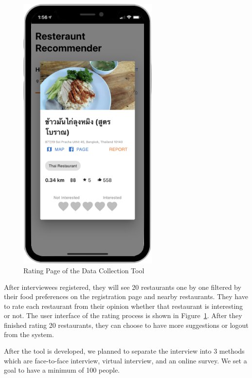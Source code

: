 \documentclass[12pt,oneside,openright,a4paper]{cpe-english-project}
\begin{document}
\newpage
\begin{figure}[H]\centering
\includegraphics[height=400pt]{./images/4RatingPageoftheDataCollectionTool.png}
\caption{Rating Page of the Data Collection Tool}\label{fig:4RatingPageoftheDataCollectionTool}
\end{figure}\vspace{-24pt}

After interviewees registered, they will see 20 restaurants one by one filtered by their food preferences on the registration page and nearby restaurants. They have to rate each restaurant from their opinion whether that restaurant is interesting or not. The user interface of the rating process is shown in Figure~\ref{fig:4RatingPageoftheDataCollectionTool}. After they finished rating 20 restaurants, they can choose to have more suggestions or logout from the system.

After the tool is developed, we planned to separate the interview into 3 methods which are face-to-face interview, virtual interview, and an online survey. We set a goal to have a minimum of 100 people.
\end{document}
